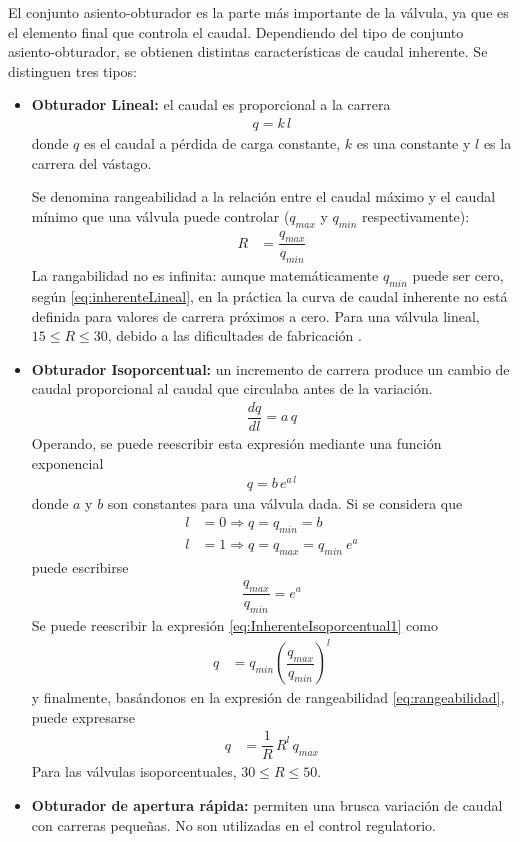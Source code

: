 El conjunto asiento-obturador es la parte más importante de la válvula, ya que
es el elemento final que controla el caudal.
Dependiendo del tipo de conjunto asiento-obturador, se obtienen distintas
características de caudal inherente.
Se distinguen tres tipos:
\begin{itemize}
  \item \textbf{Obturador Lineal:} el caudal es proporcional a la carrera
  \begin{align}
	q = k\,l
	\label{eq:inherenteLineal}
  \end{align}
  donde $q$ es el caudal a pérdida de carga constante, $k$ es una constante y
$l$ es la carrera del vástago.

Se denomina rangeabilidad a la relación entre el caudal máximo y el caudal
mínimo que una válvula puede controlar ($q_{max}$ y $q_{min}$
respectivamente):
\begin{align}
 R &= \dfrac{q_{max}}{q_{min}}
 \label{eq:rangeabilidad}
\end{align}
La rangabilidad no es infinita:
aunque matemáticamente $q_{min}$ puede ser cero, según
\eqref{eq:inherenteLineal}, en la práctica la curva de caudal inherente no está
definida para valores de carrera próximos a cero.
Para una válvula lineal, $15 \leq R \leq 30$, debido a las dificultades
de fabricación \cite{bib:ApuntesPuglesiValvulas}.

  \item \textbf{Obturador Isoporcentual:}
  un incremento de carrera produce un cambio de caudal proporcional al caudal
que circulaba antes de la variación.
  \begin{align}
    \dfrac{dq}{dl} = a \, q
  \end{align}
  Operando, se puede reescribir esta expresión mediante una función exponencial
\begin{align}
 q = b\,e^{a\,l}
 \label{eq:InherenteIsoporcentual1}
\end{align}
  donde $a$ y $b$ son constantes para una válvula dada.
  Si se considera que
    \begin{align}
        l &= 0 \Rightarrow q = q_{min} = b\\
        l &= 1 \Rightarrow q = q_{max} = q_{min} \:e^a
    \end{align}
    puede escribirse
    \begin{align}
      \dfrac{q_{max}}{q_{min}} = e^a
    \end{align}
    Se puede reescribir la expresión
\eqref{eq:InherenteIsoporcentual1} como
\begin{align}
 q &= q_{min}  \left( {\dfrac{q_{max}}{q_{min}}} \right)^{l}
\end{align}
    y finalmente, basándonos en la expresión de rangeabilidad
\eqref{eq:rangeabilidad}, puede expresarse
    \begin{align}
     q &= \dfrac{1}{R}\, R^l \, q_{max}
    \end{align}
Para las válvulas isoporcentuales, $30 \leq R \leq 50$.
  \item \textbf{Obturador de apertura rápida:} permiten una brusca variación de
caudal con carreras pequeñas.
  No son utilizadas en el control regulatorio.
\end{itemize}

